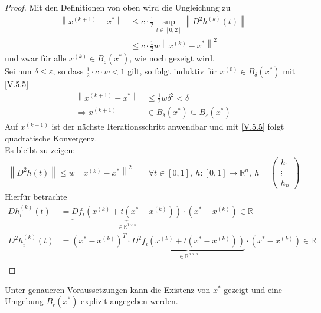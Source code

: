 \documentclass[ngerman,fontsize=11pt, paper=a4, parskip=half, titlepage=true, toc=bib]{scrbook}
\theoremstyle{definition}
\theoremstyle{plain}
\newcommand{\R}{\mathds{R}}
\newcommand{\Ren}{\mathds{R}^{n}}
\newcommand{\nn}[1]{\left\| #1 \right\|}
\begin{document}
\begin{proof}
  Mit den Definitionen von oben wird die Ungleichung zu
  \begin{align}\nonumber
    \nn{x^{(k+1)}-x^{*}} &\leq c\cdot \frac{1}{2} \sup_{t\in[0,2]} \nn{D^2h^{(k)}(t)} \\
                         & \leq c\cdot \frac{1}{2} w\nn{x^{(k)}-x^{*}}^2
                           \label{V.5.5}
  \end{align}
  und zwar für alle $x^{(k)}\in B_\varepsilon(x^{*})$, wie noch gezeigt wird.\\
  Sei nun $\delta \leq \varepsilon$, so dass $\frac{1}{2} \cdot c\cdot w <1$ gilt,
  so folgt induktiv für $x^{(0)}\in B_\delta(x^{*})$ mit \eqref{V.5.5}
  \begin{align*}
    \nn{x^{(k+1)}-x^{*}} &\leq \frac{1}{2}w\delta^2 < \delta\\
    \Rightarrow x^{(k+1)}&\in B_\delta(x^{*})\subseteq B_\varepsilon(x^{*})
  \end{align*}
  Auf $x^{(k+1)} $ ist der nächste Iterationsschritt anwendbar
  und mit \eqref{V.5.5} folgt quadratische Konvergenz.\\
  Es bleibt zu zeigen:
  \begin{gather*}
    \nn{D^2h(t)} \leq w\nn{x^{(k)}-x^{*}}^2 \qquad \forall t\in [0,1],~
    h:[0,1]\rightarrow\Ren,~ h=\begin{pmatrix} h_1 \\ \vdots \\ h_n \end{pmatrix}
  \end{gather*}
  Hierfür betrachte
  \begin{align*}
    Dh_i^{(k)}(t)&=\underbrace{Df_i\left( x^{(k)}+t(x^{*}-x^{(k)})\right)}_{\in \R^{1\times n}}
                   \cdot (x^{*}-x^{(k)})\in\R\\
    D^2h_i^{(k)}(t)&=(x^{*}-x^{(k)})^T\cdot
                     \underbrace{D^2f_i\left( x^{(k)}+t(x^{*}-x^{(k)})\right)}_{\in \R^{n\times n}}
                     \cdot (x^{*}-x^{(k)})\in\R\\
  \end{align*}
\end{proof}

Unter genaueren Voraussetzungen kann die Existenz von $x^{*}$ gezeigt 
und eine Umgebung $B_r(x^{*})$ explizit angegeben werden.
\end{document}
